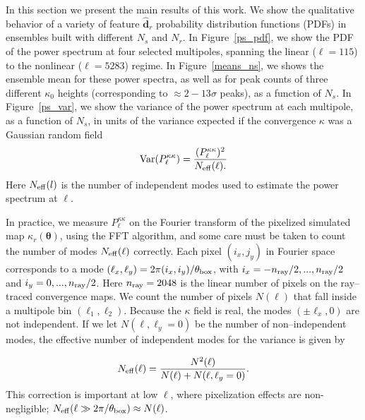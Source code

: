 \documentclass[reprint,aps,prd,superscriptaddress,showkeys,showpacs]{revtex4-1}
\newcommand{\bbh}[1]{\mathbf{\hat{#1}}}
\begin{document}

In this section we present the main results of this work. We show the
qualitative behavior of a variety of feature $\bbh{d}_r$ probability
distribution functions (PDFs) in ensembles built with different $N_s$
and $N_r$. In Figure~\ref{ps_pdf}, we show the PDF of the power
spectrum at four selected multipoles, spanning the linear ($\ell=115$)
to the nonlinear ($\ell=5283$) regime. In Figure~\ref{means_ns}, we
shows the ensemble mean for these power spectra, as well as for peak
counts of three different $\kappa_0$ heights (corresponding to
$\approx 2-13\sigma$ peaks), as a function of $N_s$.  In
Figure~\ref{ps_var}, we show the variance of the power spectrum at
each multipole, as a function of $N_s$, in units of the variance
expected if the convergence $\kappa$ was a Gaussian random field
%
\begin{equation}
\label{gaussianvar}
\mathrm{Var}(P^{\kappa\kappa}_\ell) = \frac{(P^{\kappa\kappa}_\ell)^2}{N_{\rm eff}(\ell).}
\end{equation}
%
Here $N_{\rm eff}(l)$ is the number of independent modes used to
estimate the power spectrum at $\ell$.  

In practice, we measure $P^{\kappa\kappa}_\ell$ on the Fourier
transform of the pixelized simulated map $\kappa_r(\pmb{\theta})$,
using the FFT algorithm, and some care must be taken to count the
number of modes $N_{\rm eff}(\ell)$ correctly. Each pixel $(i_x,j_y)$
in Fourier space corresponds to a mode
$(\ell_x,\ell_y)=2\pi(i_x,i_y)/\theta_{\rm box}$, with $i_x=-n_{\rm
  ray}/2,...,n_{\rm ray}/2$ and $i_y=0,...,n_{\rm ray}/2$.  Here
$n_{\rm ray}=2048$ is the linear number of pixels on the ray--traced
convergence maps.  We count the number of pixels $N(\ell)$ that fall
inside a multipole bin $(\ell_1,\ell_2)$. Because the $\kappa$ field
is real, the modes $(\pm \ell_x,0)$ are not independent. If we let
$N(\ell,\ell_y=0)$ be the number of non--independent modes, the
effective number of independent modes for the variance is given by

\begin{equation}
N_{\rm eff}(\ell) = \frac{N^2(\ell)}{N(\ell)+N(\ell,\ell_y=0)}.
\end{equation}
%
This correction is important at low $\ell$, where pixelization effects
are non-negligible; $N_{\rm eff}(\ell\gg2\pi/\theta_{\rm box})\approx
N(\ell)$.
\end{document}
